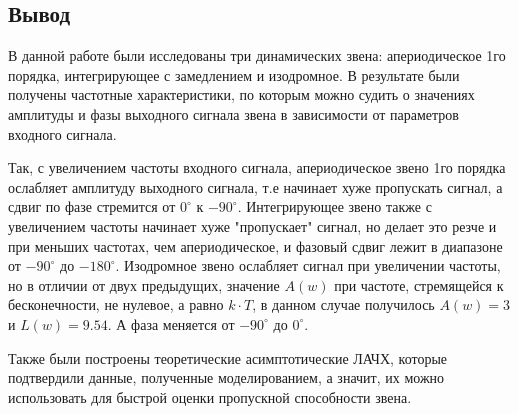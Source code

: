 \documentclass[a4paper,12pt]{article}
\begin{document}
	\clearpage
	\begin{center}
	\section*{Вывод}
	\end{center}
	
	В данной работе были исследованы три динамических звена: апериодическое 1го порядка, интегрирующее с замедлением и изодромное. В результате были получены частотные характеристики, по которым можно судить о значениях амплитуды и фазы выходного сигнала звена в зависимости от параметров входного сигнала.
	\par
	Так, с увеличением частоты входного сигнала, апериодическое звено 1го порядка ослабляет амплитуду выходного сигнала, т.е начинает хуже пропускать сигнал, а сдвиг по фазе стремится от $0^{\circ}$ к $-90^{\circ}$. Интегрирующее звено также с увеличением частоты начинает хуже "пропускает" сигнал, но делает это резче и при меньших частотах, чем апериодическое, и фазовый сдвиг лежит в диапазоне от $-90^{\circ}$ до $-180^{\circ}$. Изодромное звено ослабляет сигнал при увеличении частоты, но в отличии от двух предыдущих, значение $A(w)$ при частоте, стремящейся к бесконечности, не нулевое, а равно $k\cdot T$, в данном случае получилось $A(w)=3$ и $L(w)=9.54$. А фаза меняется от $-90^{\circ}$ до $0^{\circ}$.
	\par
	Также были построены теоретические асимптотические ЛАЧХ, которые подтвердили данные, полученные моделированием, а значит, их можно использовать для быстрой оценки пропускной способности звена.
\end{document}
